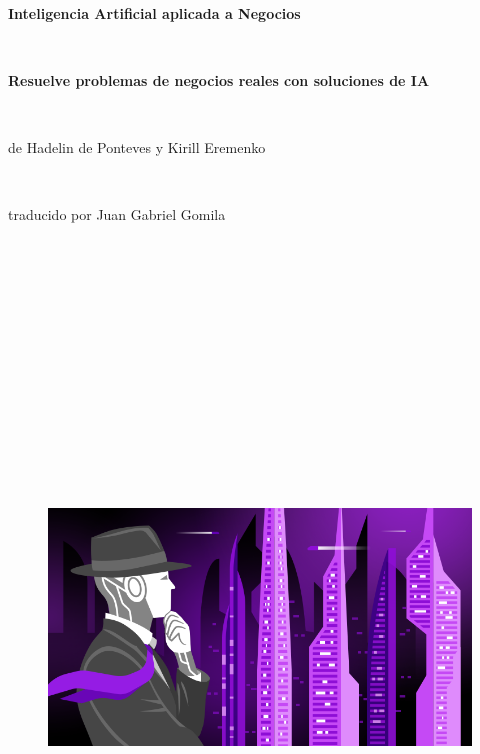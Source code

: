 
\begin{titlepage}

\begin{center}

\

\Huge \textbf{Inteligencia Artificial aplicada a Negocios}

\

\Large \textbf{Resuelve problemas de negocios reales con soluciones de IA}

\

\large de Hadelin de Ponteves y Kirill Eremenko

\

\large traducido por Juan Gabriel Gomila


\end{center}

\

\

\

\

\

\

\

\

\begin{figure}[!htbp]
		\begin{center}
			\includegraphics[scale=0.6]{Course_Image.png}
		\end{center}
\end{figure}

\end{titlepage}
